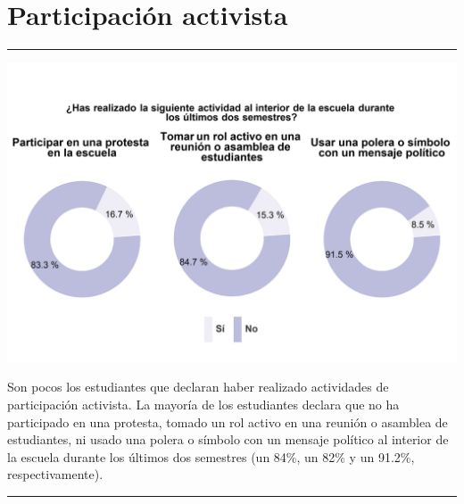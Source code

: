 \documentclass[
  14pt,
]{book}
\let\origfigure\figure
\let\endorigfigure\endfigure
\renewenvironment{figure}[1][2] {
  \expandafter\origfigure\expandafter[H]
} {
  \endorigfigure
}
\begin{document}
\hypertarget{participaciuxf3n-activista}{%
\section{Participación activista}\label{participaciuxf3n-activista}}

\begin{center}\rule{0.5\linewidth}{0.5pt}\end{center}

\begin{figure}[!ht]

{\centering \includegraphics[width=0.8\linewidth,]{images/graph_partact_esc} 

}

\caption{Participación activista al interior de la escuela}\label{fig:unnamed-chunk-55}
\end{figure}

Son pocos los estudiantes que declaran haber realizado actividades de participación activista. La mayoría de los estudiantes declara que no ha participado en una protesta, tomado un rol activo en una reunión o asamblea de estudiantes, ni usado una polera o símbolo con un mensaje político al interior de la escuela durante los últimos dos semestres (un 84\%, un 82\% y un 91.2\%, respectivamente).

\begin{center}\rule{0.5\linewidth}{0.5pt}\end{center}
\end{document}
